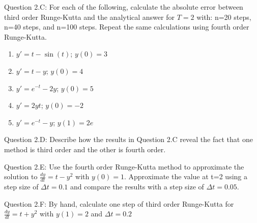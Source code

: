 \documentclass{article}
\def\ds{\displaystyle}
\begin{document}
 \medskip \par \noindent
%
Question 2.C:   For each of the following, calculate the absolute error between third order Runge-Kutta and the analytical answer for $T=2$ with: n=20 steps, n=40 steps, and n=100 steps. Repeat the same calculations using fourth order Runge-Kutta. 
\par
\begin{enumerate}[label=\alph*)]
    \item $\ds y' =t-\sin(t)$; \hspace{0.3in} $y(0)=3$
    \item $\ds y' =t-y$; \hspace{0.4in}  $y(0)=4$
    \item $\ds y' =e^{-t}-2y$; \hspace{0.2in}  $y(0)=5$
    \item $\ds y' =2yt$; \hspace{0.5in}  $y(0)=-2$
    \item $\ds y' =e^{-t}-y$; \hspace{0.3in}  $y(1)=2e$
\end{enumerate}
\medskip \par \noindent
%
Question 2.D:  Describe how the results in Question 2.C reveal the fact that one method is third order and the other is fourth order. 
\medskip \par \noindent
%
Question 2.E: Use the fourth order Runge-Kutta method to approximate the solution to $\ds \frac {dy}{dt}=t-y^2$ with $y(0)=1$. Approximate the value at t=2 using a step size of $\ds \Delta t=0.1$ and compare the results with a step size of $\ds \Delta t=0.05$. 
\medskip \par \noindent
%
Question 2.F: By hand, calculate one step of third order Runge-Kutta for $\ds \frac{dy}{dt} = t+y^2$ with $y(1)=2$ and $\ds \Delta t=0.2$
\end{document}
